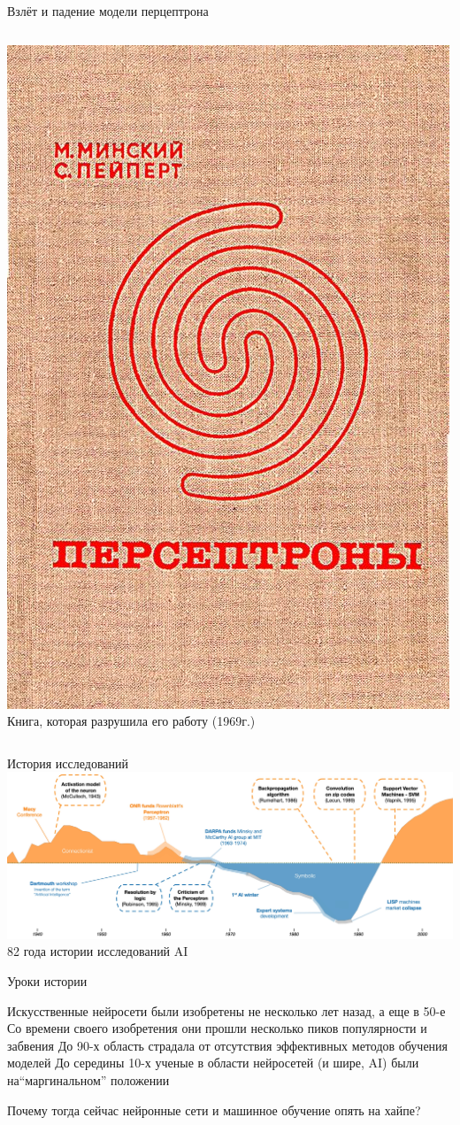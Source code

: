 \documentclass[aspectratio=169, professionalfonts]{beamer}
\begin{document}
\begin{frame}{Взлёт и падение модели перцептрона}
\begin{columns}
\begin{column}{.49\linewidth}
            \includegraphics[width=.52\linewidth]{figures/fig46-perceptrons.jpg} \\
            Книга, которая разрушила его работу (1969г.)
        \end{column}
    \end{columns}
\end{frame}

\begin{frame}{История исследований}
    \centering
    \includegraphics[width=\linewidth]{figures/fig44-research-history.jpg} \\
    82 года истории исследований AI
\end{frame}

\begin{frame}{Уроки истории}
    \large
    \begin{outline}
        \1 Искусственные нейросети были изобретены не несколько лет назад, а еще в 50-е
        \1 Со времени своего изобретения они прошли несколько пиков популярности и забвения
        \1 До 90-х область страдала от отсутствия эффективных методов обучения моделей
        \1 До середины 10-х ученые в области нейросетей (и шире, AI) были на``маргинальном'' положении
    \end{outline}

    Почему тогда сейчас нейронные сети и машинное обучение опять на хайпе?
\end{frame}
\end{document}
